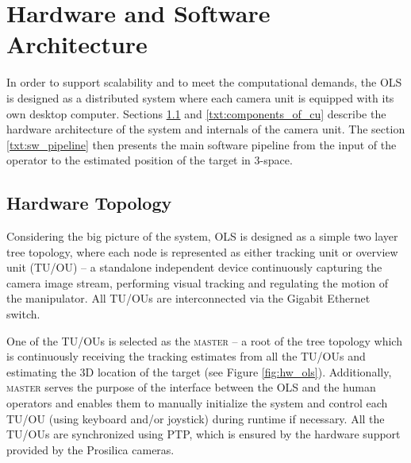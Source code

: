 \section{Hardware and Software Architecture} \label{txt:hw_and_sw_architecture}

In order to support scalability and to meet the computational demands, the OLS is designed as a distributed system where each camera unit is equipped with its own desktop computer. Sections \ref{txt:hardware_topology} and \ref{txt:components_of_cu} describe the hardware architecture of the system and internals of the camera unit. The section \ref{txt:sw_pipeline} then presents the main software pipeline from the input of the operator to the estimated position of the target in 3-space.

\subsection{Hardware Topology} \label{txt:hardware_topology}

Considering the big picture of the system, OLS is designed as a simple two layer tree topology, where each node is represented as either tracking unit or overview unit (TU/OU) -- a standalone independent device continuously capturing the camera image stream, performing visual tracking and regulating the motion of the manipulator. All TU/OUs are interconnected via the Gigabit Ethernet switch. 

One of the TU/OUs is selected as the \textsc{master} -- a root of the tree topology which is continuously receiving the tracking estimates from all the TU/OUs and estimating the 3D location of the target (see Figure \ref{fig:hw_ols}). Additionally, \textsc{master} serves the purpose of the interface between the OLS and the human operators and enables them to manually initialize the system and control each TU/OU (using keyboard and/or joystick) during runtime if necessary. All the TU/OUs are synchronized using PTP, which is ensured by the hardware support provided by the Prosilica cameras.


